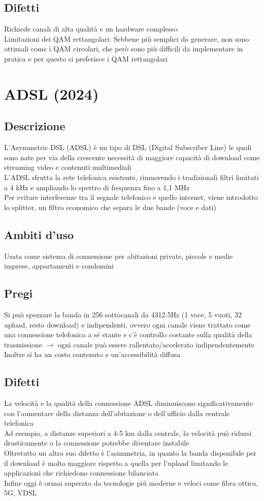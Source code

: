 \documentclass[10pt,oneside,a4paper]{article}
\begin{document}
\subsection{Difetti}
Richiede canali di alta qualità e un hardware complesso\\
Limitazioni dei QAM rettangolari: Sebbene più semplici da generare, non sono ottimali come i QAM circolari, che però sono più difficili da implementare in pratica e per questo si preferisce i QAM rettangolari
\section{ADSL (2024)}
\subsection{Descrizione}
L'Asymmetric DSL (ADSL) è un tipo di DSL (Digital Subscriber Line) le quali sono nate per via della crescente necessità di maggiore capacità di download come streaming video e contenuti multimediali\\
L'ADSL sfrutta la rete telefonica esistente, rimuovendo i tradizionali filtri limitati a 4 kHz e ampliando lo spettro di frequenza fino a 1,1 MHz\\
Per evitare interferenze tra il segnale telefonico e quello internet, viene introdotto lo splitter, un filtro economico che separa le due bande (voce e dati)
\subsection{Ambiti d'uso}
Usata come sistema di connessione per abitazioni private, piccole e medie imprese, appartamenti e condomini
\subsection{Pregi}
Si può spezzare la banda in 256 sottocanali da 4312.5Hz (1 voce, 5 vuoti, 32 upload, resto download) e indipendenti, ovvero ogni canale viene trattato come una connessione telefonica a sé stante e c'è controllo costante sulla qualità della trasmissione $\to$ ogni canale può essere rallentato/accelerato indipendentemente\\
Inoltre si ha un costo contenuto e un'accessibilità diffusa
\subsection{Difetti}
La velocità e la qualità della connessione ADSL diminuiscono significativamente con l'aumentare della distanza dell'abitazione o dell'ufficio dalla centrale telefonica\\
Ad esempio, a distanze superiori a 4-5 km dalla centrale, la velocità può ridursi drasticamente o la connessione potrebbe diventare instabile\\
Oltretutto un altro suo difetto è l'asimmetria, in quanto la banda disponibile per il download è molto maggiore rispetto a quella per l'upload limitando le applicazioni che richiedono connessione bilanciata\\
Infine oggi è ormai superata da tecnologie più moderne e veloci come fibra ottica, 5G, VDSL
\end{document}
